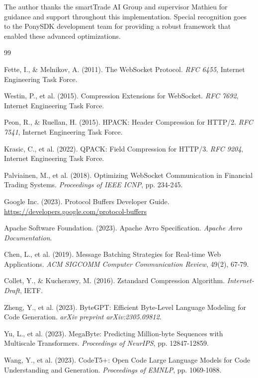 \documentclass[12pt,a4paper]{article}
\begin{document}
The author thanks the smartTrade AI Group and supervisor Mathieu for guidance and support throughout this implementation. Special recognition goes to the PonySDK development team for providing a robust framework that enabled these advanced optimizations.


\begin{thebibliography}{99}

Fette, I., \& Melnikov, A. (2011). The WebSocket Protocol. \textit{RFC 6455}, Internet Engineering Task Force.

Westin, P., et al. (2015). Compression Extensions for WebSocket. \textit{RFC 7692}, Internet Engineering Task Force.

Peon, R., \& Ruellan, H. (2015). HPACK: Header Compression for HTTP/2. \textit{RFC 7541}, Internet Engineering Task Force.

Krasic, C., et al. (2022). QPACK: Field Compression for HTTP/3. \textit{RFC 9204}, Internet Engineering Task Force.

Palviainen, M., et al. (2018). Optimizing WebSocket Communication in Financial Trading Systems. \textit{Proceedings of IEEE ICNP}, pp. 234-245.

Google Inc. (2023). Protocol Buffers Developer Guide. \url{https://developers.google.com/protocol-buffers}

Apache Software Foundation. (2023). Apache Avro Specification. \textit{Apache Avro Documentation}.

Chen, L., et al. (2019). Message Batching Strategies for Real-time Web Applications. \textit{ACM SIGCOMM Computer Communication Review}, 49(2), 67-79.

Collet, Y., \& Kucherawy, M. (2016). Zstandard Compression Algorithm. \textit{Internet-Draft}, IETF.

Zheng, Y., et al. (2023). ByteGPT: Efficient Byte-Level Language Modeling for Code Generation. \textit{arXiv preprint arXiv:2305.09812}.

Yu, L., et al. (2023). MegaByte: Predicting Million-byte Sequences with Multiscale Transformers. \textit{Proceedings of NeurIPS}, pp. 12847-12859.

Wang, Y., et al. (2023). CodeT5+: Open Code Large Language Models for Code Understanding and Generation. \textit{Proceedings of EMNLP}, pp. 1069-1088.


\end{thebibliography}
\end{document}
